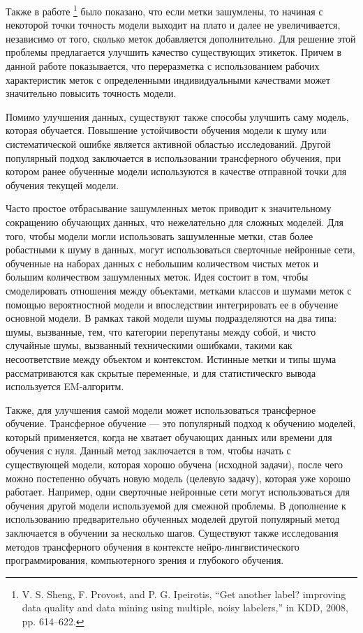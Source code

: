 \documentclass[12pt,a4paper, oneside]{extreport}
\begin{document}
Также в работе \footnote{V. S. Sheng, F. Provost, and P. G. Ipeirotis, “Get another label? 	improving data quality and data mining using multiple, noisy 	labelers,” in KDD, 2008, pp. 614–622.} было показано, что если метки зашумлены, то начиная с некоторой точки   точность модели выходит на плато и далее  не  увеличивается, независимо от того, сколько меток добавляется дополнительно. Для решение этой проблемы предлагается улучшить качество существующих этикеток. Причем в данной работе показывается, что переразметка с использованием рабочих характеристик меток  с определенными индивидуальными качествами может значительно повысить точность модели. 

Помимо улучшения данных, существуют также способы улучшить саму   модель, которая обучается. Повышение устойчивости обучения модели к шуму или систематической ошибке является активной областью исследований. Другой популярный подход заключается в использовании трансферного обучения, при котором ранее обученные модели используются в качестве отправной точки для обучения текущей модели. 

Часто простое отбрасывание зашумленных меток приводит к значительному  сокращению обучающих данных, что нежелательно для сложных моделей. Для того, чтобы модели могли   использовать  зашумленные метки, став более робастными к шуму в данных, могут использоваться сверточные нейронные сети, обученные на наборах данных  с небольшим количеством чистых меток и большим количеством зашумленных меток. Идея состоит в том, чтобы смоделировать отношения между объектами, метками классов и шумами меток с помощью вероятностной модели и впоследствии интегрировать ее в обучение основной модели.  
В рамках такой модели шумы подразделяются  на два типа: шумы,    вызванные, тем, что категории перепутаны между собой, и чисто случайные шумы, вызванный техническими ошибками, такими как несоответствие между объектом и контекстом. Истинные метки и типы шума рассматриваются как скрытые переменные, и для статистическго вывода используется EM-алгоритм. 


Также, для улучшения самой модели может использоваться трансферное обучение. Трансферное обучение  — это популярный подход к обучению моделей, который применяется,  когда не хватает обучающих данных или времени для обучения с нуля. Данный  метод заключается в том, чтобы начать с существующей модели, которая хорошо обучена (исходной задачи), после чего  можно постепенно обучать новую модель (целевую задачу), которая уже хорошо работает. 
Например, одни сверточные нейронные сети могут использоваться для обучения другой модели используемой для смежной  проблемы. 
В дополнение к использованию предварительно обученных моделей другой популярный метод заключается в  обучении за несколько шагов. 
Существуют также исследования методов трансферного обучения в контексте нейро-лингвистического  программирования, компьютерного зрения и глубокого обучения.
\end{document}
